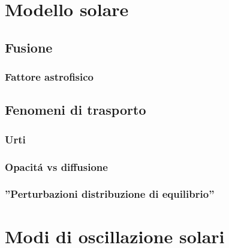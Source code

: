 \documentclass[../main.tex]{subfiles}
\begin{document}
\chapter{Modello solare}

\begin{refsection}
\nocite{*}
\begingroup
\let\clearpage\relax
\printbibliography
\endgroup

\section{Fusione}

\subsection{Fattore astrofisico}

\section{Fenomeni di trasporto}


\subsection{Urti}

\subsection{Opacit\'a vs diffusione}

\subsection{''Perturbazioni distribuzione di equilibrio''}

\end{refsection}

\chapter{Modi di oscillazione solari}
\end{document}
